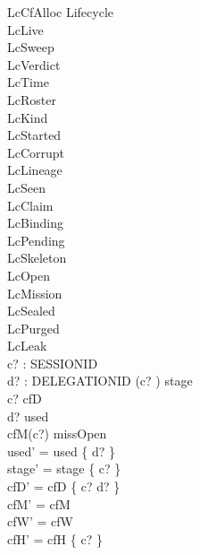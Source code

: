 \documentclass[a4paper,10pt,fleqn]{article}
\begin{document}
\begin{schema}{LcCfAlloc}
\Delta Lifecycle \\
\Xi LcLive \\
\Xi LcSweep \\
\Xi LcVerdict \\
\Xi LcTime \\
\Xi LcRoster \\
\Xi LcKind \\
\Xi LcStarted \\
\Xi LcCorrupt \\
\Xi LcLineage \\
\Xi LcSeen \\
\Xi LcClaim \\
\Xi LcBinding \\
\Xi LcPending \\
\Xi LcSkeleton \\
\Xi LcOpen \\
\Xi LcMission \\
\Xi LcSealed \\
\Xi LcPurged \\
\Xi LcLeak \\
c? : SESSIONID \\
d? : DELEGATIONID
\where
(c? ) \in stage \\
c? \notin \dom cfD \\
d? \notin used \\
cfM(c?) \in missOpen \\
used' = used \cup \{ d? \} \\
stage' = stage \oplus \{ c?  \} \\
cfD' = cfD \oplus \{ c? \mapsto d? \} \\
cfM' = cfM \\
cfW' = cfW \\
cfH' = cfH \cup \{ c? \}
\end{schema}
\end{document}
